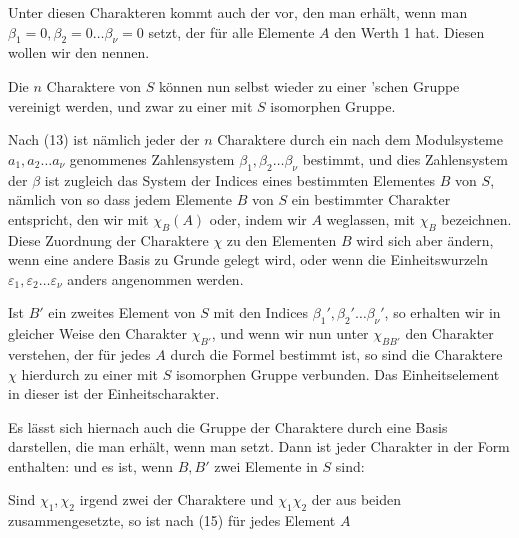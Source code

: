 
Unter diesen Charakteren kommt auch der vor, den man erhält, wenn man $\beta_1 = 0, \beta_2 = 0 \ldots \beta_\nu = 0$ setzt, der für alle Elemente $A$ den Werth 1 hat. Diesen wollen wir den  nennen.

Die $n$ Charaktere von $S$ können nun selbst wieder zu einer 'schen Gruppe vereinigt werden, und zwar zu einer mit $S$ isomorphen Gruppe.

Nach (13) ist nämlich jeder der $n$ Charaktere durch ein nach dem Modulsysteme $a_1, a_2 \ldots a_\nu$ genommenes Zahlensystem $\beta_1, \beta_2 \ldots \beta_\nu$ bestimmt, und dies Zahlensystem der $\beta$ ist zugleich das System der Indices eines bestimmten Elementes $B$ von $S$, nämlich von
so dass jedem Elemente $B$ von $S$ ein bestimmter Charakter entspricht, den wir mit $\chi_B(A)$ oder, indem wir $A$ weglassen, mit $\chi_B$ bezeichnen. Diese Zuordnung der Charaktere $\chi$ zu den Elementen $B$ wird sich aber ändern, wenn eine andere Basis zu Grunde gelegt wird, oder wenn die Einheitswurzeln $\varepsilon_1, \varepsilon_2 \ldots \varepsilon_\nu$ anders angenommen werden.

Ist $B'$ ein zweites Element von $S$ mit den Indices $\beta_1', \beta_2' \ldots \beta_\nu'$, so erhalten wir in gleicher Weise den Charakter $\chi_{B'}$, und wenn wir nun unter $\chi_{BB'}$ den Charakter verstehen, der für jedes $A$ durch die Formel
bestimmt ist, so sind die Charaktere $\chi$ hierdurch zu einer mit $S$ isomorphen Gruppe verbunden. Das Einheitselement in dieser  ist der Einheitscharakter.

Es lässt sich hiernach auch die Gruppe der Charaktere durch eine Basis darstellen, die man erhält, wenn man
setzt. Dann ist jeder Charakter in der Form enthalten:
und es ist, wenn $B, B'$ zwei Elemente in $S$ sind:

Sind $\chi_1, \chi_2$ irgend zwei der Charaktere und $\chi_1\chi_2$ der aus beiden zusammengesetzte, so ist nach (15) für jedes Element $A$
